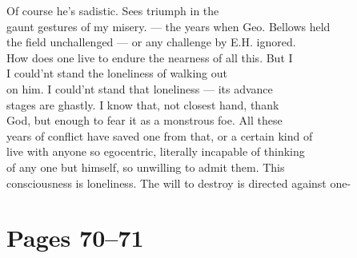 \documentclass[11pt,a4paper]{article}
\begin{document}
{Of course he's sadistic. Sees triumph in  the \\
gaunt gestures of my misery. --- the years when Geo. Bellows held \\
the field unchallenged --- or any challenge by E.H. ignored. \\
How does one live to endure the nearness of all this. But I \\
 I could'nt stand the loneliness of walking out \\
on him. I could'nt stand that loneliness --- its advance \\
stages are ghastly. I know that, not closest hand, thank \\
God, but enough to fear it as a monstrous foe. All these \\
years of conflict have saved one from that, or a certain kind of \\
live with anyone so egocentric, literally incapable of thinking \\
of any one but himself, so unwilling to admit them. This \\
consciousness is loneliness. The will to destroy is directed against one-}






\section{Pages 70--71}
\end{document}
